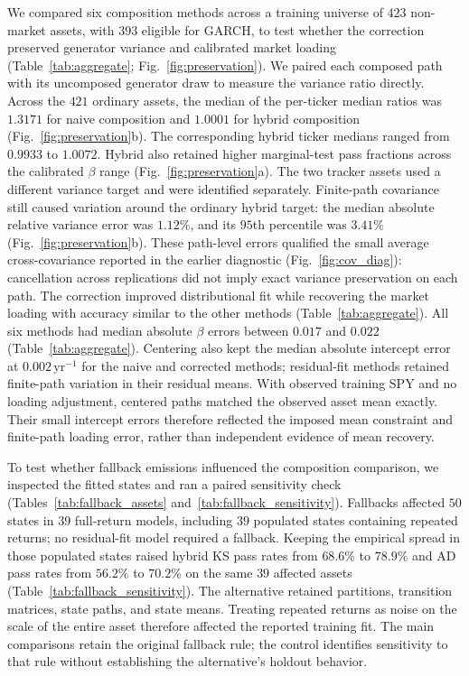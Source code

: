 We compared six composition methods across a training universe of
$423$ non-market assets, with $393$ eligible for GARCH, to test
whether the correction preserved generator variance and
calibrated market loading (Table~\ref{tab:aggregate};
Fig.~\ref{fig:preservation}). We paired each composed path with its
uncomposed generator draw to measure the variance ratio directly.
Across the $421$ ordinary assets, the median of the per-ticker
median ratios was $1.3171$ for naive composition and $1.0001$ for
hybrid composition (Fig.~\ref{fig:preservation}b). The corresponding
hybrid ticker medians ranged from $0.9933$ to $1.0072$. Hybrid also
retained higher marginal-test pass fractions across the calibrated
$\beta$ range (Fig.~\ref{fig:preservation}a). The two tracker assets
used a different variance target and were identified separately.
Finite-path covariance still caused variation around the ordinary
hybrid target: the median absolute relative variance error was
$1.12\%$, and its $95$th percentile was $3.41\%$
(Fig.~\ref{fig:preservation}b). These path-level errors qualified the
small average cross-covariance reported in the earlier diagnostic
(Fig.~\ref{fig:cov_diag}): cancellation across replications did not imply
exact variance preservation on each path.
The correction improved distributional fit while recovering the
market loading with accuracy similar to the other methods
(Table~\ref{tab:aggregate}).
All six methods had median absolute $\beta$ errors between $0.017$
and $0.022$ (Table~\ref{tab:aggregate}). Centering also kept the
median absolute intercept error at $0.002\,\mathrm{yr}^{-1}$ for
the naive and corrected methods; residual-fit methods retained
finite-path variation in their residual means. With observed training
SPY and no loading adjustment, centered paths matched the observed
asset mean exactly. Their small intercept errors therefore reflected
the imposed mean constraint and finite-path loading error, rather
than independent evidence of mean recovery.



To test whether fallback emissions influenced the composition
comparison, we inspected the fitted states and ran a paired
sensitivity check (Tables~\ref{tab:fallback_assets} and~\ref{tab:fallback_sensitivity}). Fallbacks affected $50$ states in $39$ full-return
models, including $39$ populated states containing repeated returns;
no residual-fit model required a fallback. Keeping the empirical
spread in those populated states raised hybrid KS pass rates from
$68.6\%$ to $78.9\%$ and AD pass rates from $56.2\%$ to $70.2\%$
on the same $39$ affected assets (Table~\ref{tab:fallback_sensitivity}). The alternative retained
partitions, transition matrices, state paths, and state means.
Treating repeated returns as noise on the scale of the entire asset
therefore affected the reported training fit. The main comparisons
retain the original fallback rule; the control identifies sensitivity
to that rule without establishing the alternative's holdout behavior.

